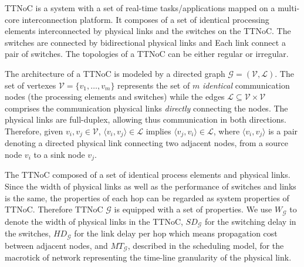 \documentclass[journal]{IEEEtran}
\newcommand{\calG}{\mathcal{G}}
\newcommand{\calV}{\mathcal{V}}
\newcommand{\calL}{\mathcal{L}}
\newcommand{\width}{\mathit{W}_\calG}
\newcommand{\SD}{\mathit{SD}_\calG}
\newcommand{\HD}{\mathit{HD}_\calG}
\newcommand{\MT}{\mathit{MT}_\calG}
\begin{document}
TTNoC is a system with a set of real-time tasks/applications mapped on a multi-core interconnection platform.
It composes of a set of identical processing elements interconnected by physical links and the switches on the TTNoC. 
The switches are connected by bidirectional physical links and Each link connect a pair of switches.
The topologies of a TTNoC can be either regular or irregular.

The architecture of a TTNoC is
modeled by a directed graph $\calG=(\calV,\calL)$. The set of vertexes
$\mathcal{V}=\{ v_{1},\dots,v_{m}\}$ represents the set of $m$
\emph{identical} communication nodes (the processing elements and
switches) while the edges $\mathcal{L}\subseteq \mathcal{V} \times
\mathcal{V}$ comprises the communication physical links
\emph{directly} connecting the nodes.  The physical links are
full-duplex, allowing thus communication in both
directions. Therefore, given $v_i,v_j\in\calV$, $\langle
v_i,v_j\rangle \in\calL$ implies $\langle v_j,v_i\rangle\in\calL$,
where $\langle v_i,v_j\rangle$ is a pair denoting a directed physical
link connecting two adjacent nodes, from a source node $v_i$ to a sink node $v_j$.

 
The TTNoC composed of a set of identical process elements and physical links.
Since the width of physical links as well as the performance of switches and links is the same, 
the properties of each hop can be regarded as system properties of TTNoC.
Therefore TTNoC $\calG$ is equipped with a set of properties.
We use $\width$
to denote the width of physical links in the TTNoC, $\SD$ for the
switching delay in the switches, $\HD$ for the link delay per hop
which means propagation cost between adjacent nodes, and $\MT$, 
described in the scheduling model, 
for the macrotick of network representing the time-line granularity of the
physical link.

\end{document}
